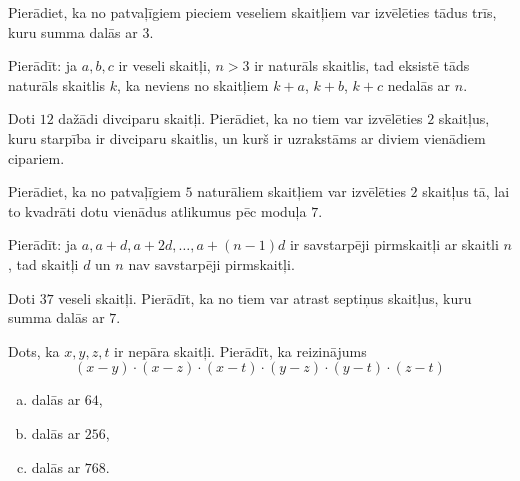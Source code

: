 \documentclass[a4paper,12pt]{article}
\begin{document}
\vspace{10pt}
\begin{problem}
Pierādiet, ka no patvaļīgiem pieciem veseliem skaitļiem 
var izvēlēties tādus trīs, kuru summa dalās ar $3$.
\end{problem}


\vspace{10pt}
\begin{problem}
Pierādīt: ja $a,b,c$ ir veseli skaitļi, $n>3$ ir naturāls skaitlis, 
tad eksistē tāds naturāls skaitlis $k$, 
ka neviens no skaitļiem $k+a$, $k+b$, $k+c$ nedalās ar $n$.
\end{problem}


\vspace{10pt}
\begin{problem}
Doti $12$ dažādi divciparu skaitļi. 
Pierādiet, ka no tiem var izvēlēties $2$ skaitļus, 
kuru starpība ir divciparu skaitlis, un kurš ir 
uzrakstāms ar diviem vienādiem cipariem.
\end{problem}


\vspace{10pt}
\begin{problem}
Pierādiet, ka no patvaļīgiem $5$ naturāliem skaitļiem 
var izvēlēties $2$ skaitļus tā, 
lai to kvadrāti dotu vienādus atlikumus pēc moduļa $7$.
\end{problem}


\vspace{10pt}
\begin{problem}
Pierādīt: ja $a,a+d,a+2d,\ldots,a+(n-1)d$ 
ir savstarpēji pirmskaitļi ar skaitli $n$, 
tad skaitļi $d$ un $n$ nav savstarpēji pirmskaitļi. 
\end{problem}


\vspace{10pt}
\begin{problem}
Doti $37$ veseli skaitļi. Pierādīt, ka no tiem var 
atrast septiņus skaitļus, kuru summa dalās ar $7$.
\end{problem}


\vspace{10pt}
\begin{problem}
Dots, ka $x,y,z,t$ ir nepāra skaitļi. Pierādīt, ka reizinājums
\[ (x-y) \cdot (x-z) \cdot (x-t) \cdot (y-z) \cdot (y-t) \cdot (z-t) \]
\begin{enumerate}[(a)]
\item dalās ar $64$,
\item dalās ar $256$,
\item dalās ar $768$.
\end{enumerate}
\end{problem}
\end{document}
